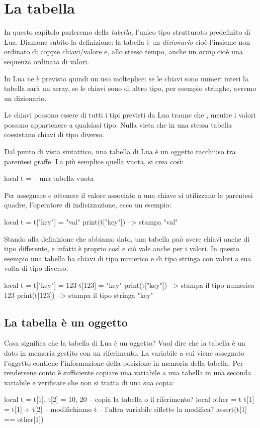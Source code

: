 

\chapter{La tabella}
\label{iChTabella}

In questo capitolo parleremo della \emph{tabella}, l'unico tipo strutturato
predefinito di Lua. Diamone subito la definizione: la tabella è un
\emph{dizionario} cioè l'insieme non ordinato di coppie chiavi/valore e, allo
stesso tempo, anche un \emph{array} cioè una sequenza ordinata di valori.

In Lua ne è previsto quindi un uso molteplice: se le chiavi sono numeri interi
la tabella sarà un array, se le chiavi sono di altro tipo, per esempio stringhe,
avremo un dizionario.

Le chiavi possono essere di tutti i tipi previsti da Lua tranne che ,
mentre i valori possono appartenere a qualsiasi tipo. Nulla vieta che in una
stessa tabella coesistano chiavi di tipo diverso.

Dal punto di vista sintattico, una tabella di Lua è un oggetto racchiuso tra
parentesi graffe. La più semplice quella vuota, si crea così:
\begin{lines}
local t = {} -- una tabella vuota
\end{lines}

Per assegnare e ottenere il valore associato a una chiave si utilizzano le
parentesi quadre, l'operatore di indicizzazione, ecco un esempio:
\begin{lines}
local t = {}
t["key"] = "val"
print(t["key"]) --> stampa "val"
\end{lines}

Stando alla definizione che abbiamo dato, una tabella può avere chiavi anche di
tipo differente, e infatti è proprio così e ciò vale anche per i valori. In
questo esempio una tabella ha chiavi di tipo numerico e di tipo stringa con
valori a sua volta di tipo diverso:
\begin{lines}
local t = {}
t["key"] = 123
t[123] = "key"
print(t["key"]) --> stampa il tipo numerico 123
print(t[123])   --> stampa il tipo stringa "key"
\end{lines}


\section{La tabella è un oggetto}

Cosa significa che la tabella di Lua è un oggetto? Vuol dire che la tabella è un
dato in memoria gestito con un riferimento. La variabile a cui viene assegnato
l'oggetto contiene l'informazione della posizione in memoria della tabella. Per
rendersene conto è sufficiente copiare una variabile a una tabella in una
seconda variabile e verificare che non si tratta di una sua copia:
\begin{lines}
local t = {}
t[1], t[2] = 10, 20
-- copia la tabella o il riferimento?
local other = t
t[1] = t[1] + t[2] -- modifichiamo t
-- l'altra variabile riflette la modifica?
assert(t[1] == other[1])
\end{lines}

